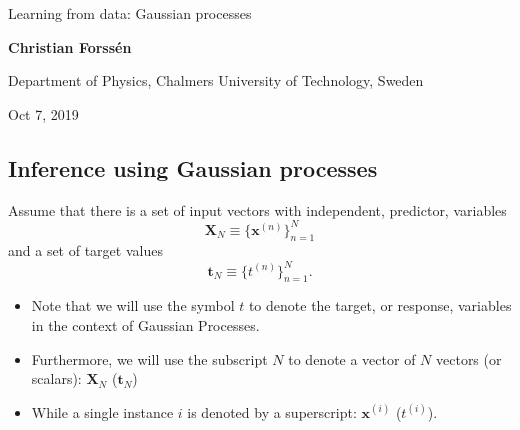 \documentclass[%
oneside,                 %
final,                   %
10pt]{article}
\begin{document}

\newcommand{\exercisesection}[1]{\subsection*{#1}}







\thispagestyle{empty}

\begin{center}
{\LARGE\bf
\begin{spacing}{1.25}
Learning from data: Gaussian processes
\end{spacing}
}
\end{center}


\begin{center}
{\bf Christian Forssén}
\end{center}

    \begin{center}
\centerline{{\small Department of Physics, Chalmers University of Technology, Sweden}}
\end{center}
    

\begin{center}
Oct 7, 2019
\end{center}

\vspace{1cm}


\subsection{Inference using Gaussian processes}

Assume that there is a set of input vectors with independent, predictor, variables
\[ \boldsymbol{X}_N \equiv \{ \boldsymbol{x}^{(n)}\}_{n=1}^N \]
and a set of target values
\[ \boldsymbol{t}_N \equiv \{ t^{(n)}\}_{n=1}^N. \]

\begin{itemize}
\item Note that we will use the symbol $t$ to denote the target, or response, variables in the context of Gaussian Processes. 

\item Furthermore, we will use the subscript $N$ to denote a vector of $N$ vectors (or scalars): $\boldsymbol{X}_N$ ($\boldsymbol{t}_N$)

\item While a single instance $i$ is denoted by a superscript: $\boldsymbol{x}^{(i)}$ ($t^{(i)}$).
\end{itemize}
\end{document}
